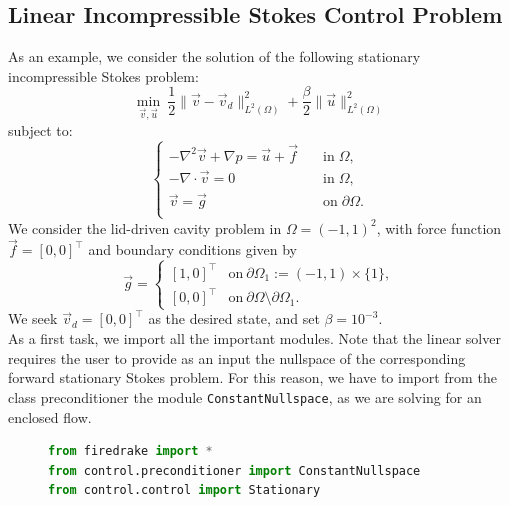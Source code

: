\documentclass[letterpaper,10pt,english]{sphinxmanual}
\begin{document}
\subsection{Linear Incompressible Stokes Control Problem}
As an example, we consider the solution of the following stationary incompressible Stokes problem:
\begin{displaymath}
\min_{\vec{v},\vec{u}} ~ \frac{1}{2} \| \vec{v} - \vec{v}_d \|^2_{L^2(\Omega)} + \frac{\beta}{2} \| \vec{u} \|^2_{L^2(\Omega)}
\end{displaymath}
subject to:
\begin{displaymath}
\left\{
\begin{array}{ll}
- \nabla^2 \vec{v} + \nabla p = \vec{u} + \vec{f} & \quad \mathrm{in} \; \Omega,\\
- \nabla \cdot \vec{v} = 0 & \quad \mathrm{in} \; \Omega,\\
\vec{v} = \vec{g} & \quad \mathrm{on} \; \partial \Omega.\\
\end{array}
\right.
\end{displaymath}
We consider the lid-driven cavity problem in $\Omega = (-1,1)^2$, with force function $\vec{f}=[0,0]^\top$ and boundary conditions given by
\begin{displaymath}
	\vec{g} =
	\left\{
		\begin{array}{ll}
			\left[1,0\right]^\top & \mathrm{on} \: \partial \Omega_1 := (-1,1) 
				\times \{1 \},\\
			\left[0,0\right]^\top & \mathrm{on} \: \partial \Omega
				\setminus \partial\Omega_1.
		\end{array}
	\right.
\end{displaymath}
We seek $\vec{v}_d=[0,0]^\top$ as the desired state, and set $\beta=10^{-3}$.\\
As a first task, we import all the important modules. Note that the linear solver requires the user to provide as an input the nullspace of the corresponding forward stationary Stokes problem. For this reason, we have to import from the class preconditioner the module \texttt{ConstantNullspace}, as we are solving for an enclosed flow.
\begin{figure}[!h]
\begin{lstlisting}[language=Python]
from firedrake import *
from control.preconditioner import ConstantNullspace
from control.control import Stationary
\end{lstlisting}
\end{figure}
\end{document}

